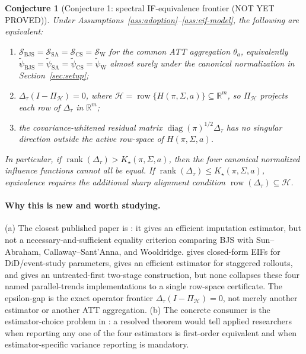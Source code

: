 \documentclass[11pt]{article}
\newcommand{\calH}{\mathcal{H}}
\newcommand{\R}{\mathbb{R}}
\theoremstyle{definition}
\theoremstyle{plain}
\newtheorem{conjecture}{Conjecture}
\theoremstyle{remark}
\begin{document}
\begin{conjecture}[Conjecture 1: spectral IF-equivalence frontier (NOT YET PROVED)]\label{conj:if-frontier}
Under Assumptions~\ref{ass:adoption}--\ref{ass:eif-model}, the following are
equivalent:
\begin{enumerate}[label=(\roman*)]
\item
\(\mathcal S_{\mathrm{BJS}}=\mathcal S_{\mathrm{SA}}=\mathcal S_{\mathrm{CS}}=\mathcal S_{\mathrm{W}}\)
for the common ATT aggregation \(\theta_a\), equivalently
\(\widetilde\psi_{\mathrm{BJS}}=\widetilde\psi_{\mathrm{SA}}
=\widetilde\psi_{\mathrm{CS}}=\widetilde\psi_{\mathrm{W}}\) almost surely under
the canonical normalization in Section~\ref{sec:setup};
\item
\(\Delta_\tau(I-\Pi_{\calH})=0\), where
\(\calH=\operatorname{row}\{H(\pi,\Sigma,a)\}\subseteq\R^m\), so
\(\Pi_{\calH}\) projects each row of \(\Delta_\tau\) in \(\R^m\);
\item
the covariance-whitened residual matrix
\(\operatorname{diag}(\pi)^{1/2}\Delta_\tau\) has no singular direction outside
the active row-space of \(H(\pi,\Sigma,a)\).
\end{enumerate}
In particular, if \(\operatorname{rank}(\Delta_\tau)>K_\star(\pi,\Sigma,a)\),
then the four canonical normalized influence functions cannot all be equal.  If
\(\operatorname{rank}(\Delta_\tau)\le K_\star(\pi,\Sigma,a)\), equivalence
requires the additional sharp alignment condition
\(\operatorname{row}(\Delta_\tau)\subseteq\calH\).
\end{conjecture}

\paragraph{Why this is new and worth studying.}
(a) The closest published paper is \citet{BorusyakJaravelSpiess2024}: it gives
an efficient imputation estimator, but not a necessary-and-sufficient equality
criterion comparing BJS with Sun--Abraham, Callaway--Sant'Anna, and Wooldridge.
\citet{ChenSantAnnaXie2025} gives closed-form EIFs for DiD/event-study
parameters, \citet{RothSantAnna2023Efficient} gives an efficient estimator for
staggered rollouts, and \citet{Gardner2022} gives an untreated-first two-stage
construction, but none collapses these four named parallel-trends
implementations to a single row-space certificate.  The epsilon-gap is the exact
operator frontier \(\Delta_\tau(I-\Pi_{\calH})=0\), not merely another estimator
or another ATT aggregation.  (b) The concrete consumer is the estimator-choice
problem in \citet{RothSantAnnaBilinskiPoe2023}: a resolved theorem would tell
applied researchers when reporting any one of the four estimators is
first-order equivalent and when estimator-specific variance reporting is
mandatory.
\end{document}
